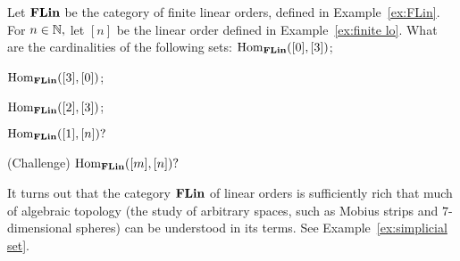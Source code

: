 \documentclass[../main/CT4S-EN-RU]{subfiles}
\begin{document}
\begin{exampleRUS}\label{ex:FLin}
\end{exampleRUS}

\begin{exerciseENG}
Let ${\mathbf{FLin}}$ be the category of finite linear orders, defined in Example~\ref{ex:FLin}. For $n\in{\mathbb N},$ let $[n]$ be the linear order defined in Example~\ref{ex:finite lo}. What are the cardinalities of the following sets: 
\sexc $\operatorname{Hom}_{{\mathbf{FLin}}}([0],[3])$; 
\item $\operatorname{Hom}_{\mathbf{FLin}}([3],[0])$;
\item $\operatorname{Hom}_{\mathbf{FLin}}([2],[3])$;
\item $\operatorname{Hom}_{\mathbf{FLin}}([1],[n])?$
\item (Challenge) $\operatorname{Hom}_{\mathbf{FLin}}([m],[n])?$
\endsexc

It turns out that the category ${\mathbf{FLin}}$ of linear orders is sufficiently rich that much of algebraic topology (the study of arbitrary spaces, such as Mobius strips and $7$-dimensional spheres) can be understood in its terms. See Example~\ref{ex:simplicial set}.
\end{exerciseENG}

\begin{exerciseRUS}
\end{exerciseRUS}
\end{document}
